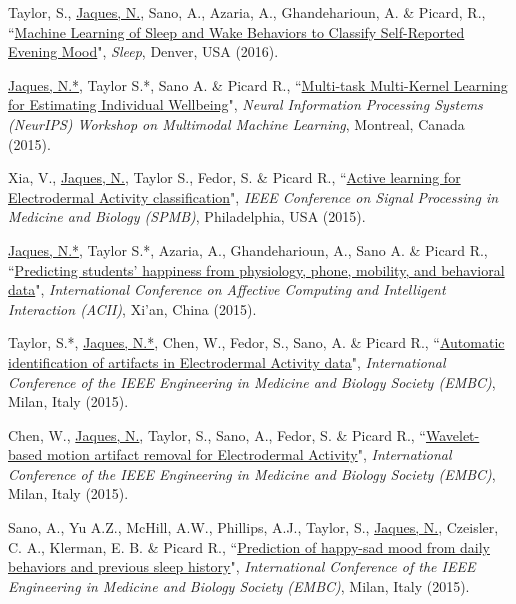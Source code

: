 \documentclass[paper=letter,fontsize=11pt]{scrartcl} %
\newcommand{\PaperEntry}[6]{
		\noindent #1, ``\href{#6}{#2}", \textit{#3}, #4 (#5).}
\begin{document}
\begin{etaremune}
\item \PaperEntry{Taylor, S., \underline{Jaques, N.}, Sano, A., Azaria, A., Ghandeharioun, A. \& Picard, R.}{Machine Learning of Sleep and Wake Behaviors to Classify Self-Reported Evening Mood}{Sleep}{Denver, USA}{2016}{https://affect.media.mit.edu/pdfs/16.Taylor-ClassifyingSelfReportedMood-SLEEP2016.pdf}

\item \PaperEntry{\underline{Jaques, N.*}, Taylor S.*, Sano A. \& Picard R.}{Multi-task Multi-Kernel Learning for Estimating Individual Wellbeing}{Neural Information Processing Systems (NeurIPS) Workshop on Multimodal Machine Learning}{Montreal, Canada}{2015}{https://affect.media.mit.edu/pdfs/15.Jaques-etal-NIPSMMML.pdf}

\item \PaperEntry{Xia, V., \underline{Jaques, N.}, Taylor S., Fedor, S. \& Picard R.}{Active learning for Electrodermal Activity classification}{IEEE Conference on Signal Processing in Medicine and Biology (SPMB)}{Philadelphia, USA}{2015}{https://dspace.mit.edu/openaccess-disseminate/1721.1/109392}

\item \PaperEntry{\underline{Jaques, N.*}, Taylor S.*, Azaria, A., Ghandeharioun, A., Sano A. \& Picard R.}{Predicting students' happiness from physiology, phone, mobility, and behavioral data}{International Conference on Affective Computing and Intelligent Interaction (ACII)}{Xi'an, China}{2015}{https://www.ncbi.nlm.nih.gov/pmc/articles/PMC5431070/}

\item \PaperEntry{Taylor, S.*, \underline{Jaques, N.*}, Chen, W., Fedor, S., Sano, A. \& Picard R.}{Automatic identification of artifacts in Electrodermal Activity data}{International Conference of the IEEE Engineering in Medicine and Biology Society (EMBC)}{Milan, Italy}{2015}{https://www.ncbi.nlm.nih.gov/pmc/articles/PMC5413200/}

\item \PaperEntry{Chen, W., \underline{Jaques, N.}, Taylor, S., Sano, A., Fedor, S. \& Picard R.}{Wavelet-based motion artifact removal for Electrodermal Activity}{International Conference of the IEEE Engineering in Medicine and Biology Society (EMBC)}{Milan, Italy}{2015}{https://www.ncbi.nlm.nih.gov/pmc/articles/PMC5413204/}

\item \PaperEntry{Sano, A., Yu A.Z., McHill, A.W., Phillips, A.J., Taylor, S., \underline{Jaques, N.}, Czeisler, C. A., Klerman, E. B. \& Picard R.}{Prediction of happy-sad mood from daily behaviors and previous sleep history}{International Conference of the IEEE Engineering in Medicine and Biology Society (EMBC)}{Milan, Italy}{2015}{https://www.ncbi.nlm.nih.gov/pmc/articles/PMC4768795/}


\end{etaremune}
\end{document}
